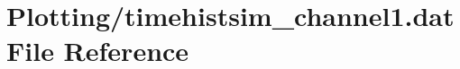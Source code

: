 \hypertarget{Plotting_2timehistsim__channel1_8dat}{}\section{Plotting/timehistsim\+\_\+channel1.dat File Reference}
\label{Plotting_2timehistsim__channel1_8dat}
